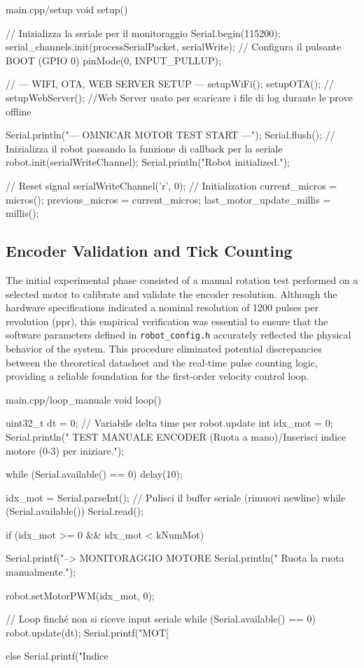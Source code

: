 \begin{vscode}{main.cpp/setup}
void setup() {
  // Inizializza la seriale per il monitoraggio
  Serial.begin(115200);
  serial_channels.init(processSerialPacket, serialWrite);
  // Configura il pulsante BOOT (GPIO 0)
  pinMode(0, INPUT_PULLUP);

  // --- WIFI, OTA, WEB SERVER SETUP ---
  setupWiFi();
  setupOTA();
  // setupWebServer(); //Web Server usato per scaricare i file di log durante le prove offline

  Serial.println("--- OMNICAR MOTOR TEST START ---");
  Serial.flush();
  // Inizializza il robot passando la funzione di callback per la seriale
  robot.init(serialWriteChannel);
  Serial.println("Robot initialized.");
  
  // Reset signal
  serialWriteChannel('r', 0);
  // Initialization
  current_micros = micros();
  previous_micros = current_micros;
  last_motor_update_millis = millis();
}
\end{vscode}

\subsection{Encoder Validation and Tick Counting}
The initial experimental phase consisted of a manual rotation test performed on a selected motor to calibrate and validate the encoder resolution. Although the hardware specifications indicated a nominal resolution of 1200 pulses per revolution (ppr), this empirical verification was essential to ensure that the software parameters defined in \texttt{robot\_config.h} accurately reflected the physical behavior of the system. This procedure eliminated potential discrepancies between the theoretical datasheet and the real-time pulse counting logic, providing a reliable foundation for the first-order velocity control loop.

\begin{vscode}{main.cpp/loop\_manuale}
void loop() {
  uint32_t dt = 0; // Variabile delta time per robot.update
  int idx_mot = 0;
  Serial.println("   TEST MANUALE ENCODER (Ruota a mano)/\n Inserisci indice motore (0-3) per iniziare.");

  while (Serial.available() == 0) {
    delay(10);
  }

  idx_mot = Serial.parseInt();
  // Pulisci il buffer seriale (rimuovi newline)
  while (Serial.available()) { Serial.read(); }

  if (idx_mot >= 0 && idx_mot < kNumMot) {
    Serial.printf("--> MONITORAGGIO MOTORE %
    Serial.println("    Ruota la ruota manualmente.");

    robot.setMotorPWM(idx_mot, 0);

    // Loop finché non si riceve input seriale
    while (Serial.available() == 0) {
      robot.update(dt);
      Serial.printf("MOT[%
    }
  } else {
    Serial.printf("Indice %
  }
}
\end{vscode}

